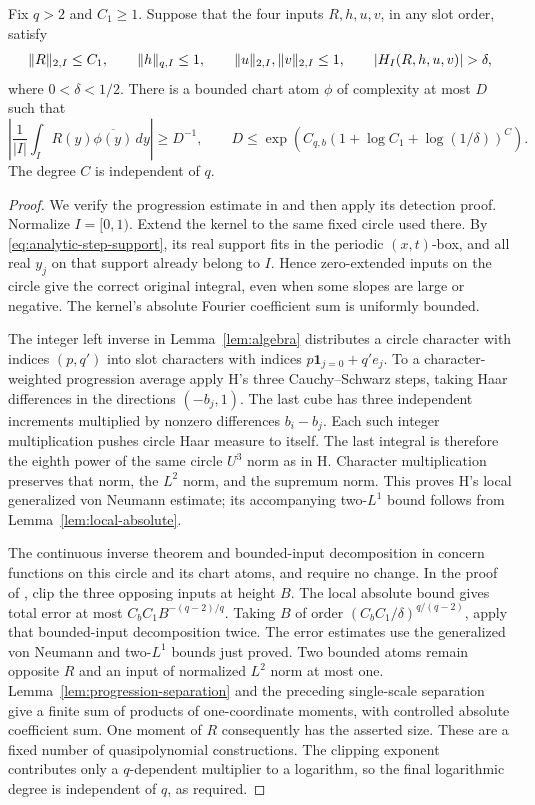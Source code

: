 \begin{lemma}\label{lem:local-detection}
Fix \(q>2\) and \(C_1\ge1\).  Suppose that the four inputs
\(R,h,u,v\), in any slot order, satisfy
\[
 \norm R_{2,I}\le C_1,\qquad \norm h_{q,I}\le1,\qquad
 \norm u_{2,I},\norm v_{2,I}\le1,
 \qquad |H_I(R,h,u,v)|>\delta,
\]
where \(0<\delta<1/2\).  There is a bounded chart atom \(\phi\)
of complexity at most \(D\) such that
\[
 \left|\frac1{|I|}\int_I R(y)\overline{\phi(y)}\,dy\right|
 \ge D^{-1},\qquad
 D\le\exp\!\left(C_{q,b}
          (1+\log C_1+\log(1/\delta))^C\right).
\]
The degree \(C\) is independent of \(q\).
\end{lemma}
\begin{proof}
We verify the progression estimate in \cite[Lemma~4.11]{H} and then
apply its detection proof.  Normalize \(I=[0,1)\).  Extend the kernel
to the same fixed circle used there.  By
\eqref{eq:analytic-step-support}, its real support fits in the
periodic \((x,t)\)-box, and all real \(y_j\) on that support already
belong to \(I\).  Hence zero-extended inputs on the circle give the
correct original integral, even when some slopes are large or negative.
The kernel's absolute Fourier coefficient sum is uniformly bounded.

The integer left inverse in Lemma~\ref{lem:algebra} distributes a
circle character with indices \((p,q')\) into slot characters with
indices \(p\mathbf1_{j=0}+q'e_j\).  To a character-weighted
progression average apply H's three Cauchy--Schwarz steps, taking
Haar differences in the directions \((-b_j,1)\).  The last cube has
three independent increments multiplied by nonzero differences
\(b_i-b_j\).  Each such integer multiplication pushes circle Haar
measure to itself.  The last integral is therefore the eighth power
of the same circle \(U^3\) norm as in H.  Character multiplication
preserves that norm, the \(L^2\) norm, and the supremum norm.  This
proves H's local generalized von Neumann estimate; its accompanying
two-\(L^1\) bound follows from Lemma~\ref{lem:local-absolute}.

The continuous inverse theorem and bounded-input decomposition in
\cite[Sections~4.5--4.6]{H} concern functions on this circle and its
chart atoms, and require no change.  In the proof of
\cite[Lemma~4.12]{H}, clip the three opposing inputs at height \(B\).
The local absolute bound gives total error at most
\(C_bC_1B^{-(q-2)/q}\).  Taking
\(B\) of order \((C_bC_1/\delta)^{q/(q-2)}\), apply that
bounded-input decomposition twice.  The error estimates use the
generalized von Neumann and two-\(L^1\) bounds just proved.
Two bounded atoms remain opposite \(R\) and an input of normalized
\(L^2\) norm at most one.  Lemma~\ref{lem:progression-separation}
and the preceding single-scale separation give a finite sum of
products of one-coordinate moments, with controlled absolute
coefficient sum.  One moment of \(R\) consequently has the asserted
size.  These are a fixed number of quasipolynomial constructions.
The clipping exponent contributes only a \(q\)-dependent multiplier
to a logarithm, so the final logarithmic degree is independent of
\(q\), as required.
\end{proof}

